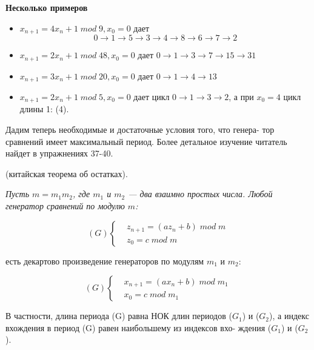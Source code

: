 \textbf{Несколько примеров} \begin{itemize}
\item $x_{n+1} = 4x_{n}+1 \; mod \; 9, x_{0} = 0$ дает 
$$0 \to 1 \to 5 \to 3 \to 4 \to 8 \to 6 \to 7 \to 2$$
\item $x_{n+1} = 2x_{n} + 1 \; mod \; 48, x_{0} = 0$ дает $0 \to 1 \to 3 \to 7 \to 15 \to 31$
\item $x_{n+1} = 3x_{n} + 1 \; mod \; 20, x_{0} = 0$ дает $0 \to 1 \to 4 \to 13$
\item $x_{n+1} = 2x_{n} + 1 \; mod \; 5, x_{0} = 0$ дает цикл $0 \to 1 \to 3 \to 2$, а при \linebreak $x_{0} = 4$ цикл длины 1: (4).
\end{itemize}
Дадим теперь необходимые и достаточные условия того, что генера- \linebreak  тор сравнений имеет максимальный период. Более детальное изучение \linebreak читатель найдет в упражнениях 37-40. \par 
\begin{predl} (китайская теорема об остатках). \par
\indent\slshape{Пусть $m = m_{1}m_{2}$, где  $m_{1}$ и $m_{2}$} --- два взаимно простых числа. Любой \linebreak генератор сравнений по модулю $m$: \par 

\begin{equation*}
(G) 
 \begin{cases}
   &\text{$z_{n+1} = (az_{n} + b) \; mod \; m$}\\
   &\text{$z_{0} = c \; mod \; m$}
 \end{cases}
\end{equation*}

\noindent есть декартово произведение генераторов по модулям $m_{1}$ и $m_{2}$: \linebreak
 
 \begin{equation*}
(G) 
 \begin{cases}
   &\text{$x_{n+1} = (ax_{n} + b) \; mod \; m_{1}$}\\
   &\text{$x_{0} = c \; mod \; m_{1}$}
 \end{cases}
\end{equation*}
 
 
\noindent В частности, длина периода (G) равна НОК длин периодов ($G_{1}$) и ($G_{2}$), \linebreak а индекс вхождения в период (G) равен наибольшему из индексов вхо- \linebreak ждения ($G_{1}$) и ($G_{2}$). \par
\end{predl} 
